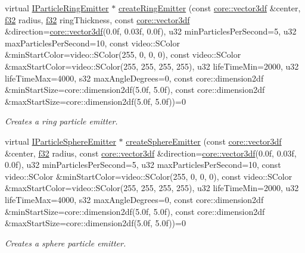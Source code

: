 \begin{DoxyCompactItemize}
virtual \hyperlink{classirr_1_1scene_1_1IParticleRingEmitter}{I\+Particle\+Ring\+Emitter} $\ast$ \hyperlink{classirr_1_1scene_1_1IParticleSystemSceneNode_adee7e28b730ce82ae78e01ccccfff98e}{create\+Ring\+Emitter} (const \hyperlink{namespaceirr_1_1core_ae6e2b2a6c552833ebbd5b7463d03586b}{core\+::vector3df} \&center, \hyperlink{namespaceirr_a0277be98d67dc26ff93b1a6a1d086b07}{f32} radius, \hyperlink{namespaceirr_a0277be98d67dc26ff93b1a6a1d086b07}{f32} ring\+Thickness, const \hyperlink{namespaceirr_1_1core_ae6e2b2a6c552833ebbd5b7463d03586b}{core\+::vector3df} \&direction=\hyperlink{namespaceirr_1_1core_ae6e2b2a6c552833ebbd5b7463d03586b}{core\+::vector3df}(0.\+0f, 0.\+03f, 0.\+0f), u32 min\+Particles\+Per\+Second=5, u32 max\+Particles\+Per\+Second=10, const video\+::\+S\+Color \&min\+Start\+Color=video\+::\+S\+Color(255, 0, 0, 0), const video\+::\+S\+Color \&max\+Start\+Color=video\+::\+S\+Color(255, 255, 255, 255), u32 life\+Time\+Min=2000, u32 life\+Time\+Max=4000, s32 max\+Angle\+Degrees=0, const core\+::dimension2df \&min\+Start\+Size=core\+::dimension2df(5.\+0f, 5.\+0f), const core\+::dimension2df \&max\+Start\+Size=core\+::dimension2df(5.\+0f, 5.\+0f))=0
\begin{DoxyCompactList}\small\item\em Creates a ring particle emitter. \end{DoxyCompactList}\item 
virtual \hyperlink{classirr_1_1scene_1_1IParticleSphereEmitter}{I\+Particle\+Sphere\+Emitter} $\ast$ \hyperlink{classirr_1_1scene_1_1IParticleSystemSceneNode_abb4fe6b6346ede961805166fc5355fef}{create\+Sphere\+Emitter} (const \hyperlink{namespaceirr_1_1core_ae6e2b2a6c552833ebbd5b7463d03586b}{core\+::vector3df} \&center, \hyperlink{namespaceirr_a0277be98d67dc26ff93b1a6a1d086b07}{f32} radius, const \hyperlink{namespaceirr_1_1core_ae6e2b2a6c552833ebbd5b7463d03586b}{core\+::vector3df} \&direction=\hyperlink{namespaceirr_1_1core_ae6e2b2a6c552833ebbd5b7463d03586b}{core\+::vector3df}(0.\+0f, 0.\+03f, 0.\+0f), u32 min\+Particles\+Per\+Second=5, u32 max\+Particles\+Per\+Second=10, const video\+::\+S\+Color \&min\+Start\+Color=video\+::\+S\+Color(255, 0, 0, 0), const video\+::\+S\+Color \&max\+Start\+Color=video\+::\+S\+Color(255, 255, 255, 255), u32 life\+Time\+Min=2000, u32 life\+Time\+Max=4000, s32 max\+Angle\+Degrees=0, const core\+::dimension2df \&min\+Start\+Size=core\+::dimension2df(5.\+0f, 5.\+0f), const core\+::dimension2df \&max\+Start\+Size=core\+::dimension2df(5.\+0f, 5.\+0f))=0
\begin{DoxyCompactList}\small\item\em Creates a sphere particle emitter. \end{DoxyCompactList}\item 

\end{DoxyCompactItemize}
